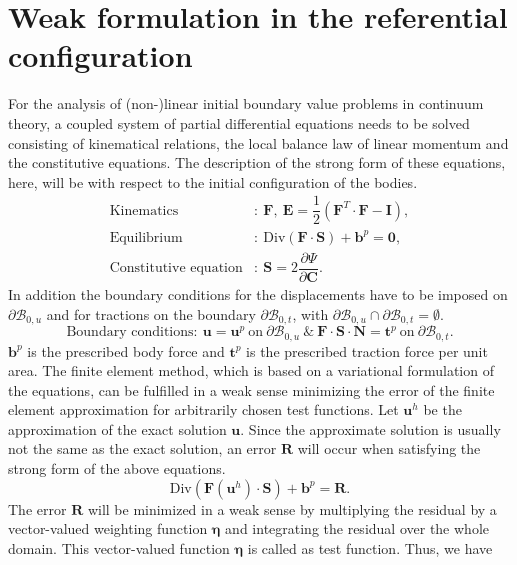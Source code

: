 \section{Weak formulation in the referential configuration}
For the analysis of (non-)linear initial boundary value problems in continuum theory, a coupled system of partial differential equations needs to be solved consisting of kinematical relations, the local balance law of linear momentum and the constitutive equations. The description of the strong form of these equations, here, will be with respect to the initial configuration of the bodies. 
\begin{align*}
\text{Kinematics}&: \ \mathbf{F}, \ \mathbf{E} = \dfrac{1}{2} (\mathbf{F}^T \cdot \mathbf{F} - \mathbf{I}), \\
\text{Equilibrium}&: \ \text{Div}(\mathbf{F} \cdot \mathbf{S}) + \mathbf{b}^p = \mathbf{0}, \\
\text{Constitutive equation}&: \ \mathbf{S} = 2\dfrac{\partial \Psi}{\partial \mathbf{C}}.
\end{align*}
In addition the boundary conditions for the displacements have to be imposed on $\partial \mathcal{B}_{0,u}$ and for tractions on the boundary $\partial \mathcal{B}_{0,t}$, with $\partial \mathcal{B}_{0,u} \cap \partial \mathcal{B}_{0,t} = \emptyset$.
\begin{equation*}
\text{Boundary conditions} : \ \mathbf{u} = \mathbf{u}^p \ \text{on} \ \partial \mathcal{B}_{0,u} \ \& \ \mathbf{F} \cdot \mathbf{S} \cdot \mathbf{N} = \mathbf{t}^p \ \text{on} \ \partial \mathcal{B}_{0,t}.
\end{equation*}
$\mathbf{b}^p$ is the prescribed body force and $\mathbf{t}^p$ is the prescribed traction force per unit area. The finite element method, which is based on a variational formulation of the equations, can be fulfilled in a weak sense minimizing the error of the finite element approximation for arbitrarily chosen test functions. Let $\mathbf{u}^h$ be the approximation of the exact solution $\mathbf{u}$. Since the approximate solution is usually not the same as the exact solution, an error $\mathbf{R}$ will occur when satisfying the strong form of the above equations.
\begin{equation}
\text{Div}(\mathbf{F}(\mathbf{u}^h) \cdot \mathbf{S}) + \mathbf{b}^p = \mathbf{R}.
\end{equation}
The error $\mathbf{R}$ will be minimized in a weak sense by multiplying the residual by a vector-valued weighting function $\bm{\eta}$ and integrating the residual over the whole domain. This vector-valued function $\bm{\eta}$ is called as test function. Thus, we have
